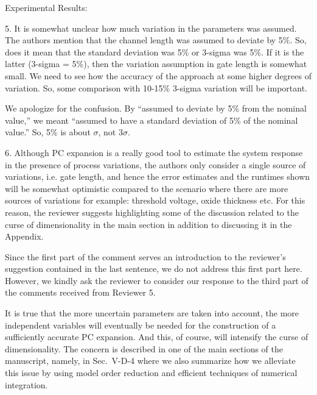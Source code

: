 \begin{reviewer}
Experimental Results:

5. It is somewhat unclear how much variation in the parameters was assumed. The authors mention that the channel length was assumed to deviate by 5\%. So, does it mean that the standard deviation was 5\% or 3-sigma was 5\%. If it is the latter (3-sigma = 5\%), then the variation assumption in gate length is somewhat small. We need to see how the accuracy of the approach at some higher degrees of variation. So, some comparison with 10-15\% 3-sigma variation will be important.
\end{reviewer}
\begin{authors}
We apologize for the confusion.
By ``assumed to deviate by 5\% from the nominal value,'' we meant ``assumed to have a standard deviation of 5\% of the nominal value.''
So, 5\% is about $\sigma$, not $3 \sigma$.

\end{authors}

\begin{reviewer}
6. Although PC expansion is a really good tool to estimate the system response in the presence of process variations, the authors only consider a single source of variations, i.e. gate length, and hence the error estimates and the runtimes shown will be somewhat optimistic compared to the scenario where there are more sources of variations for example: threshold voltage, oxide thickness etc. For this reason, the reviewer suggests highlighting some of the discussion related to the curse of dimensionality in the main section in addition to discussing it in the Appendix.
\end{reviewer}
\begin{authors}
Since the first part of the comment serves an introduction to the reviewer's suggestion contained in the last sentence, we do not address this first part here.
However, we kindly ask the reviewer to consider our response to the third part of the comments received from Reviewer 5.

It is true that the more uncertain parameters are taken into account, the more independent variables will eventually be needed for the construction of a sufficiently accurate PC expansion.
And this, of course, will intensify the curse of dimensionality.
The concern is described in one of the main sections of the manuscript, namely, in Sec.~V-D-4 where we also summarize how we alleviate this issue by using model order reduction and efficient techniques of numerical integration.

\end{authors}

